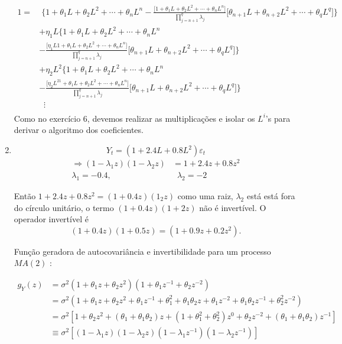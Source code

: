 \begin{enumerate}
\begin{align*}
	1=&\; \Bigg\{1+\theta_1L+\theta_2L^2+\cdots+\theta_nL^n-\frac{\bigg[1+\theta_1L+\theta_2L^2+\cdots+\theta_nL^n\bigg]}{\prod\limits_{j=n+1}^q\lambda_j}\bigg[\theta_{n+1}L+\theta_{n+2}L^2+\cdots+\theta_qL^q\bigg]\Bigg\}\\
	&+\eta_1L\Bigg\{1+\theta_1L+\theta_2L^2+\cdots+\theta_nL^n\\
	&-\frac{\bigg[\eta_1L1+\theta_1L+\theta_2L^2+\cdots+\theta_nL^n\bigg]}{\prod\limits_{j=n+1}^q\lambda_j}\bigg[\theta_{n+1}L+\theta_{n+2}L^2+\cdots+\theta_qL^q\bigg]\Bigg\}\\
	&+\eta_2L^2\Bigg\{1+\theta_1L+\theta_2L^2+\cdots+\theta_nL^n\\
	&-\frac{\bigg[\eta_2L^21+\theta_1L+\theta_2L^2+\cdots+\theta_nL^n\bigg]}{\prod\limits_{j=n+1}^q\lambda_j}\bigg[\theta_{n+1}L+\theta_{n+2}L^2+\cdots+\theta_qL^q\bigg]\Bigg\}\\
	&\;\;\vdots\\
\end{align*}
Como no exercício 6, devemos realizar as multiplicações e isolar os $L^i$'s para derivar o algoritmo dos coeficientes.
	
	\item %
	
	
		$$Y_t=(1+2.4L+0.8L^2)\varepsilon_t$$
	\begin{align*}
		\Rightarrow (1-\lambda_1z)(1-\lambda_2z)&=1+2.4z+0.8z^2\\
		\lambda_1=-0.4,&\;\;\lambda_2=-2
	\end{align*}

Então $1+2.4z+0.8z^2=(1+0.4z)(1_2z)$ como uma raiz, $\lambda_2$ está está fora do círculo unitário, o termo $(1+0.4z)(1+2z)$ não é invertível. O operador invertível é $$(1+0.4z)(1+0.5z)=(1+0.9z+0.2z^2).$$ 

	Função geradora de autocovariância e invertibilidade para um processo $MA(2)$ :

				\begin{align*}
					g_Y(z)&=\sigma^2(1+\theta_1z+\theta_2z^2)(1+\theta_1z^{-1}+\theta_2z^{-2})\\
					&=\sigma^2(1+\theta_1z+\theta_2z^2+\theta_1z^{-1}+\theta_1^2+\theta_1\theta_2z+\theta_1z^{-2}+\theta_1\theta_2z^{-1}+\theta_2^2z^{-2})\\
					&=\sigma^2[1+\theta_2z^2+(\theta_1+\theta_1\theta_2)z+(1+\theta_1^2+\theta_2^2)z^0+\theta_2z^{-2}+(\theta_1+\theta_1\theta_2)z^{-1}]\\
					&\equiv \sigma^2[(1-\lambda_1z)(1-\lambda_2z)(1-\lambda_1z^{-1})(1-\lambda_2z^{-1})]\\
				\end{align*}
				

\end{enumerate}
